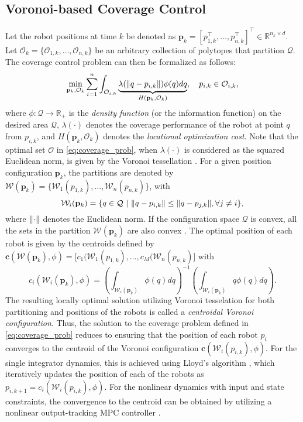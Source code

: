 \subsection{Voronoi-based Coverage Control}
Let the robot positions at time $k$ be denoted as $\mathbf{p}_k = [p_{1,k}^\top, \dots, p_{n,k}^\top]^\top \in \mathbb{R}^{n_x\times d}$. Let $\mathcal{O}_k = \{\mathcal{O}_{1,k}, \dots, \mathcal{O}_{n,k} \}$ be an arbitrary collection of polytopes that partition $\mathcal{Q}$. The coverage control problem can then be formalized as follows:
\begin{equation}
\label{eq:coverage_prob}
    \min_{\mathbf{p}_k,\mathcal{O}_k} \sum_{i=1}^n \int_{\mathcal{O}_{i,k}} \underbrace{\lambda(\lVert q - p_{i,k}\rVert) \phi(q)dq}_{H(\mathbf{p}_k,\mathcal{O}_k)}, \quad p_{i,k} \in \mathcal{O}_{i,k},
\end{equation}
where $\phi: \mathcal{Q} \rightarrow\mathbb{R}_+$ is the \textit{density function} (or the information function) on the desired area $\mathcal{Q}$, $\lambda(\cdot)$ denotes the coverage performance of the robot at point $q$ from $p_{i,k}$, and $H(\mathbf{p}_k,\mathcal{O}_k)$ denotes the \textit{locational optimization cost}. Note that the optimal set $\mathcal{O}$ in \eqref{eq:coverage_prob}, when $\lambda(\cdot)$ is considered as the squared Euclidean norm, is given by the Voronoi tessellation \cite{cortes2004coverage,du2006convergence}. For a given position configuration $\mathbf{p}_k$, the partitions are denoted by $\mathcal{W}(\mathbf{p}_k) = \{ \mathcal{W}_{1}(p_{1,k}), \dots, \mathcal{W}_{n}(p_{n,k})\}$, with
\begin{equation}
    \mathcal{W}_{i}(\mathbf{p}_k) = \{ q \in \mathcal{Q} \ | \ \lVert q-p_{i,k}\rVert \leq \lVert q - p_{j,k}\rVert, \forall j  \neq i\}, 
\end{equation}
where $\lVert\cdot\rVert$ denotes the Euclidean norm. If the configuration space $\mathcal{Q}$ is convex, all the sets in the partition $\mathcal{W}(\mathbf{p}_k)$ are also convex \cite{du2006convergence}. The optimal position of each robot is given by the centroids defined by $\mathbf{c}(\mathcal{W}(\mathbf{p}_k), \phi) = \big[c_1(\mathcal{W}_1(p_{1,k}), \dots, c_M(\mathcal{W}_n(p_{n,k})\big]$ with 
\begin{equation}
\label{eq:centroid}
    c_i(\mathcal{W}_i(\mathbf{p}_k), \phi) = \left( \int_{\mathcal{W}_i(\mathbf{p}_k)} \phi(q)dq\right)^{-1} \left(\int_{\mathcal{W}_i(\mathbf{p}_k)}q\phi(q)dq \right).
\end{equation}
The resulting locally optimal solution utilizing Voronoi tesselation for both partitioning and positions of the robots is called a \textit{centroidal Voronoi configuration}. Thus, the solution to the coverage problem defined in \eqref{eq:coverage_prob} reduces to ensuring that the position of each robot $p_i$ converges to the centroid of the Voronoi configuration $\mathbf{c}(\mathcal{W}_i(p_{i,k}), \phi)$. For the single integrator dynamics, this is achieved using Lloyd's algorithm \cite{cortes2004coverage}, which iteratively updates the position of each of the robots as $p_{i,k+1} = c_i(\mathcal{W}_i(p_{i,k}), \phi)$. For the nonlinear dynamics with input and state constraints, the convergence to the centroid can be obtained by utilizing a nonlinear output-tracking MPC controller \cite{carron2020model}. 

